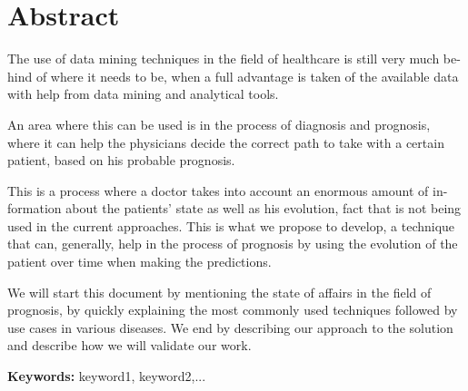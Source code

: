 
\section*{Abstract}


The use of data mining techniques in the field of healthcare is still very much be-hind of where it needs to be, when a full
advantage is taken of the available data with help from data mining and analytical tools.

An area where this can be used is in the process of diagnosis and prognosis, where it can help the physicians decide the
 correct path to take with a certain patient, based on his probable prognosis. 

This is a process where a doctor takes into account an enormous amount of in-formation about the patients’ state as well
 as his evolution, fact that is not being used in the current approaches. This is what we propose to develop, a technique
 that can, generally, help in the process of prognosis by using the evolution of the patient over time when making the predictions.

We will start this document by mentioning the state of affairs in the field of prognosis, by quickly explaining the most
 commonly used techniques followed by use cases in various diseases. We end by describing our approach to the solution and 
 describe how we will validate our work. 


\vfill

\textbf{\Large Keywords:} keyword1, keyword2,...

\cleardoublepage

